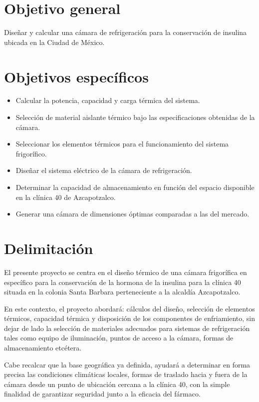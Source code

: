 \section*{Objetivo general}
Diseñar y calcular una cámara de refrigeración para la conservación de insulina ubicada en la Ciudad de México. 

\section*{Objetivos específicos}

\begin{itemize}
	\item	Calcular la potencia, capacidad y carga térmica del sistema. 
	\item	Selección de material aislante térmico bajo las especificaciones obtenidas de la cámara.
	\item	Seleccionar los elementos térmicos para el funcionamiento del sistema frigorífico.
	\item	Diseñar el sistema eléctrico de la cámara de refrigeración. 
	\item	Determinar la capacidad de almacenamiento en función del espacio disponible en la clínica 40 de Azcapotzalco.
	\item	Generar una cámara de dimensiones óptimas comparadas a las del mercado.
	
\end{itemize}

\newpage
\section*{Delimitación}
 
El presente proyecto se centra en el diseño térmico de una cámara frigorífica en específico para la conservación de la hormona de la insulina para la clínica 40 situada en la colonia Santa Barbara perteneciente a la alcaldía Azcapotzalco.

En este contexto, el proyecto abordará: cálculos del diseño, selección de elementos térmicos, capacidad térmica y disposición de los componentes de enfriamiento, sin dejar de lado la selección de materiales adecuados para sistemas de refrigeración tales como equipo de iluminación, puntos de acceso a la cámara, formas de almacenamiento etcétera. 

Cabe recalcar que la base geográfica ya definida, ayudará a determinar en forma precisa las condiciones climáticas locales, formas de traslado hacia y fuera de la cámara desde un punto de ubicación cercana a la clínica 40, con la simple finalidad de garantizar seguridad junto a la eficacia del fármaco. 





